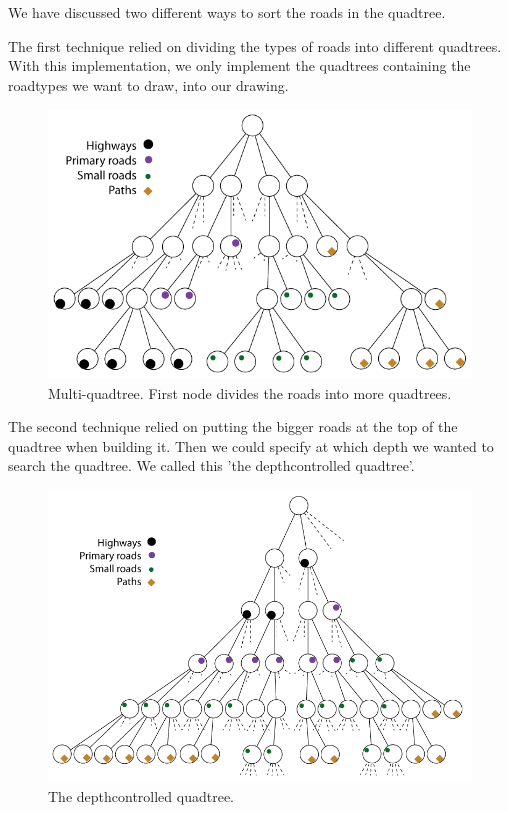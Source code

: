 We have discussed two different ways to sort the roads in the quadtree. 

The first technique relied on dividing the types of roads into different quadtrees.
With this implementation, we only implement the quadtrees containing the roadtypes 
we want to draw, into our drawing.

\begin{figure}[h!]
\centering
\includegraphics[width=1\linewidth]{images/MultiQuadtree.png}
\caption{Multi-quadtree. First node divides the roads into more
quadtrees.}
\label{IMPL-DCQ}
\end{figure}

The second technique relied on putting the bigger roads at the top of the
quadtree when building it. Then we could specify at which depth we wanted to
search the quadtree. We called this 'the depthcontrolled quadtree'.

\begin{figure}[h!]
\centering
\includegraphics[width=1\linewidth]{images/DepthcontrolledQuadtree.png}
\caption{The depthcontrolled quadtree.}
\label{IMPL-DCQ}
\end{figure}


